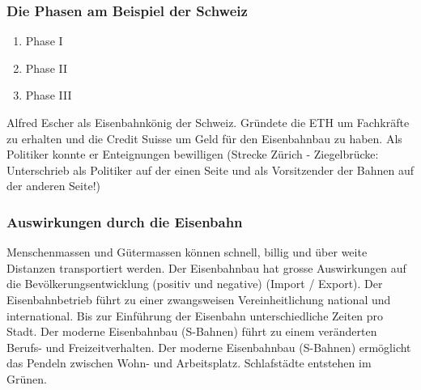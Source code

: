 \documentclass[10pt, openright=true]{scrartcl}
\begin{document}
\subsubsection{Die Phasen am Beispiel der Schweiz}
\begin{enumerate}
\item Phase I
\item Phase II
\item Phase III
\end{enumerate}
Alfred Escher als Eisenbahnkönig der Schweiz. Gründete die ETH um Fachkräfte zu erhalten und die Credit Suisse um Geld für den Eisenbahnbau zu haben. Als Politiker konnte er Enteignungen bewilligen (Strecke Zürich - Ziegelbrücke: Unterschrieb als Politiker auf der einen Seite und als Vorsitzender der Bahnen auf der anderen Seite!)
\subsubsection{Auswirkungen durch die Eisenbahn}
Menschenmassen und Gütermassen können schnell, billig und über weite Distanzen transportiert werden. Der Eisenbahnbau hat grosse Auswirkungen auf die Bevölkerungsentwicklung (positiv und negative) (Import / Export). Der Eisenbahnbetrieb führt zu einer zwangsweisen Vereinheitlichung national und international. Bis zur Einführung der Eisenbahn unterschiedliche Zeiten pro Stadt. Der moderne Eisenbahnbau (S-Bahnen) führt zu einem veränderten Berufs- und Freizeitverhalten. Der moderne Eisenbahnbau (S-Bahnen) ermöglicht das Pendeln zwischen Wohn- und Arbeitsplatz. Schlafstädte entstehen im Grünen.
\end{document}
